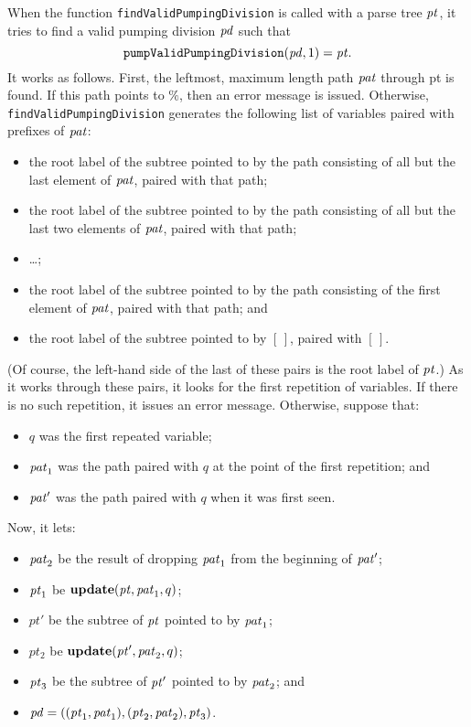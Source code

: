When the function \texttt{findValidPumpingDivision} is called with a
parse tree ${\it pt}$, it tries to find a valid pumping division ${\it pd}$ such
that
\begin{displaymath}
\mathtt{pumpValidPumpingDivision}({\it pd}, 1) = {\it pt} .  
\end{displaymath}
It works as follows. First, the leftmost, maximum length path ${\it pat}$
through pt is found. If this path points to $\%$, then an error
message is issued. Otherwise, \texttt{findValidPumpingDivision}
generates the following list of variables paired with prefixes of
${\it pat}$:
\begin{itemize}
\item the root label of the subtree pointed to by the path consisting
  of all but the last element of ${\it pat}$, paired with that path;

\item the root label of the subtree pointed to by the path consisting
  of all but the last two elements of ${\it pat}$, paired with that path;

\item \ldots;

\item the root label of the subtree pointed to by the path consisting
  of the first element of ${\it pat}$, paired with that path; and

\item the root label of the subtree pointed to by $[\,]$, paired with $[\,]$. 
\end{itemize}
(Of course, the left-hand side of the last of these pairs is the root
label of ${\it pt}$.)
As it works through these pairs, it looks for the first
repetition of variables. If there is no such repetition, it issues an
error message. Otherwise, suppose that:
\begin{itemize}
\item $q$ was the first repeated variable;

\item ${\it pat}_1$ was the path paired with $q$ at the point of the first
  repetition; and

\item ${\it pat}'$ was the path paired with $q$ when it was first seen. 
\end{itemize}
Now, it lets:
\begin{itemize}
\item ${\it pat}_2$ be the result of dropping ${\it pat}_1$ from the beginning of
  ${\it pat}'$;

\item ${\it pt}_1$ be $\mathbf{update}({\it pt}, {\it pat}_1, q)$;

\item $pt'$ be the subtree of ${\it pt}$ pointed to by ${\it pat}_1$;

\item $pt_2$ be $\mathbf{update}({\it pt}', {\it pat}_2, q)$;

\item ${\it pt}_3$ be the subtree of ${\it pt}'$ pointed to by ${\it pat}_2$; and

\item ${\it pd} = (({\it pt}_1, {\it pat}_1), ({\it pt}_2, {\it pat}_2), {\it pt}_3)$.
\end{itemize}
